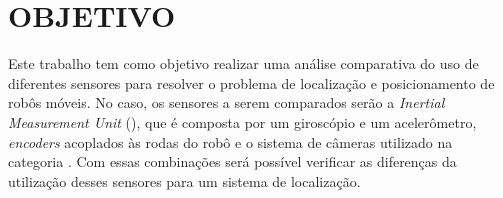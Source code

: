 \documentclass[acronym, symbols, table]{fei}
\begin{document}

%	
	
	\section{OBJETIVO}
	
		Este trabalho tem como objetivo realizar uma análise comparativa do uso de diferentes sensores para resolver o problema de localização e posicionamento de robôs móveis. No caso, os sensores a serem comparados serão a \textit{Inertial Measurement Unit} (), que é composta por um giroscópio e um acelerômetro, \textit{encoders} acoplados às rodas do robô e o sistema de câmeras utilizado na categoria . Com essas combinações será possível verificar as diferenças da utilização desses sensores para um sistema de localização.
	
%		
%		
%		
		
\end{document}
